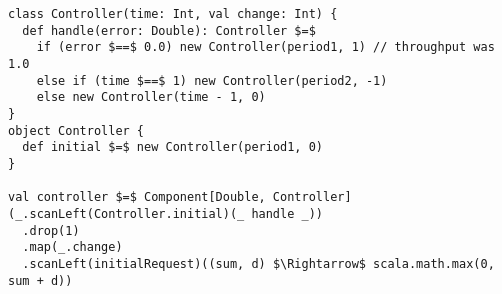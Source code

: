 \begin{minipage}{\linewidth}
\begin{lstlisting}[style=ScalaStyle, caption={Controller implementation for controlling the buffer}, label={lst:buffer-controller}]
class Controller(time: Int, val change: Int) {
  def handle(error: Double): Controller $=$
    if (error $==$ 0.0) new Controller(period1, 1) // throughput was 1.0
    else if (time $==$ 1) new Controller(period2, -1)
    else new Controller(time - 1, 0)
}
object Controller {
  def initial $=$ new Controller(period1, 0)
}

val controller $=$ Component[Double, Controller](_.scanLeft(Controller.initial)(_ handle _))
  .drop(1)
  .map(_.change)
  .scanLeft(initialRequest)((sum, d) $\Rightarrow$ scala.math.max(0, sum + d))
\end{lstlisting}
\end{minipage}

